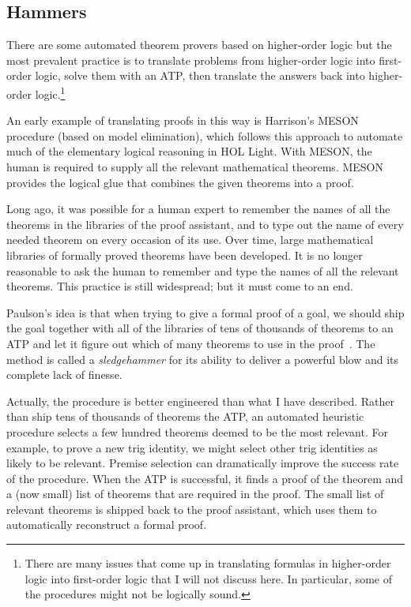 \documentclass[brochure,english,12pt]{bourbaki}
\theoremstyle{plain}
\begin{document}
\subsection{Hammers}

There are some automated theorem provers based on higher-order logic %
but the most prevalent practice is to translate problems from higher-order logic into first-order logic,
solve them with an ATP, 
then translate the answers back into higher-order logic.\footnote{There are many
issues that come up in translating formulas in higher-order logic into first-order logic that I will not
discuss here.  In particular, some of the procedures might not be logically sound.}

An early example of translating proofs in this way is Harrison's MESON procedure (based on model elimination), 
which follows this approach
to automate much of the elementary logical reasoning in HOL Light.  With MESON, the human
is required to supply all the relevant mathematical theorems.  MESON provides the logical
glue that combines the given theorems into a proof.   

Long ago, it was possible for a human expert to remember the names of all the theorems in the libraries
of the proof assistant, and to type out the name of every needed theorem on every occasion of its use.
Over time, large  mathematical libraries of formally proved theorems have been developed.  It is no longer
reasonable to ask the human to remember and type the names of all the relevant theorems.
This practice is still widespread; but it must come to an end.

Paulson's idea is that when trying to give a formal proof 
of a goal, we should
ship the goal together with all of the libraries of tens of thousands of theorems to an ATP
and let it figure out which of many theorems to use in the proof~\cite{Paar}.  
The method is called a {\it sledgehammer}  for its ability to deliver a powerful blow and its complete lack of finesse.

Actually, the procedure is better engineered than what I have described.  Rather than ship tens of thousands
of theorems the ATP, an automated heuristic procedure selects a few hundred theorems
deemed to be the most relevant.  For example, to prove a new trig identity, we might select other
trig identities as likely to be relevant.  Premise selection  can dramatically
improve the success rate of the procedure.  When the ATP is successful, it finds
a proof of the theorem and a (now small) list of theorems that are required in the proof.  
The small list of relevant theorems is shipped back to the proof assistant, which uses them to automatically
reconstruct a formal proof.
\end{document}
